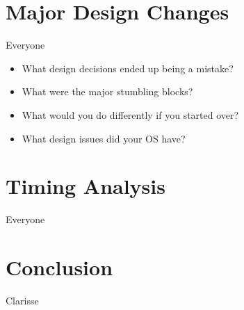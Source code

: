 \documentclass[11pt, oneside]{article}
\begin{document}
\section{Major Design Changes}
Everyone
\begin{itemize}
\item What design decisions ended up being a mistake?
\item What were the major stumbling blocks?
\item What would you do differently if you started over?
\item What design issues did your OS have?
\end{itemize}

\section{Timing Analysis}
Everyone

\section{Conclusion}
Clarisse
\end{document}
